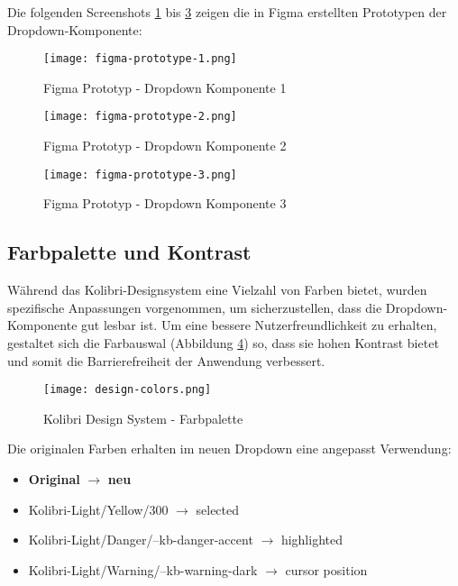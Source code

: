 Die folgenden Screenshots \ref{img:figmaPrototype1} bis \ref{img:figmaPrototype3} zeigen die in Figma erstellten Prototypen der Dropdown-Komponente:

\begin{figure}[!htb]
    \centering
    \texttt{[image: figma-prototype-1.png]}
    \caption{Figma Prototyp - Dropdown Komponente 1}
    \label{img:figmaPrototype1}
\end{figure}

\begin{figure}[!htb]
    \centering
    \texttt{[image: figma-prototype-2.png]}
    \caption{Figma Prototyp - Dropdown Komponente 2}
    \label{img:figmaPrototype2}
\end{figure}

\begin{figure}[!htb]
    \centering
    \texttt{[image: figma-prototype-3.png]}
    \caption{Figma Prototyp - Dropdown Komponente 3}
    \label{img:figmaPrototype3}
\end{figure}


\subsection{Farbpalette und Kontrast}

Während das Kolibri-Designsystem eine Vielzahl von Farben bietet, wurden spezifische Anpassungen vorgenommen, um sicherzustellen, dass die Dropdown-Komponente gut lesbar ist. 
Um eine bessere Nutzerfreundlichkeit zu erhalten, gestaltet sich die Farbauswal (Abbildung \ref{img:designColors}) so, dass sie hohen Kontrast bietet und somit die Barrierefreiheit der Anwendung verbessert.

\begin{figure}[!htb]
    \centering
    \texttt{[image: design-colors.png]}
    \caption{Kolibri Design System - Farbpalette}
    \label{img:designColors}
\end{figure}

Die originalen Farben erhalten im neuen Dropdown eine angepasst Verwendung:

\begin{itemize}
    \item \textbf{Original} $\rightarrow$ \textbf{neu}
    \item Kolibri-Light/Yellow/300 $\rightarrow$ selected
    \item Kolibri-Light/Danger/--kb-danger-accent $\rightarrow$ highlighted
    \item Kolibri-Light/Warning/--kb-warning-dark $\rightarrow$ cursor position
\end{itemize}


